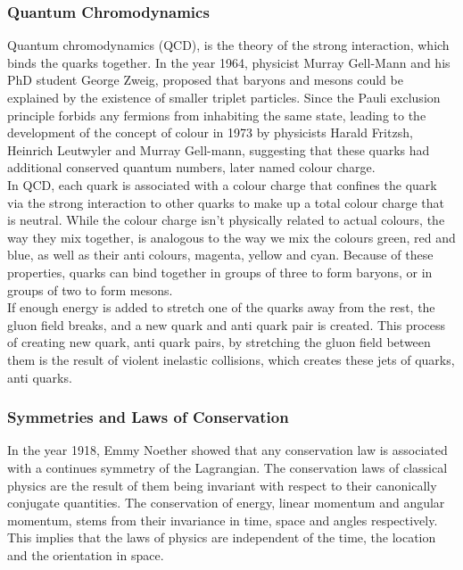 \documentclass[12pt,a4paper]{article}
\numberwithin{equation}{section}
\begin{document}
\subsubsection{Quantum Chromodynamics}
Quantum chromodynamics (QCD), is the theory of the strong interaction, which
binds the quarks together. In the year 1964, physicist Murray Gell-Mann and his
PhD student George Zweig, proposed that baryons and mesons could be explained by
the existence of smaller triplet particles\cite{GELLMANN1964214}. Since the
Pauli exclusion principle forbids any fermions from inhabiting the same state,
leading to the development of the concept of colour in 1973\cite{FRITZSCH1973365}
by physicists Harald Fritzsh, Heinrich Leutwyler and Murray Gell-mann,
suggesting that these quarks had additional conserved
quantum numbers, later named colour charge.\\

In QCD, each quark is associated with a colour charge that confines the quark via
the strong interaction to other quarks to make up a total colour charge that is
neutral. While the colour charge isn't physically related to actual colours, the
way they mix together, is analogous to the way we mix the colours green, red and
blue, as well as their anti colours, magenta, yellow and cyan. Because of these
properties, quarks can bind together in groups of three to form baryons, or in
groups of two to form mesons.\\

If enough energy is added to stretch one of the quarks away from the rest, the
gluon field breaks, and a new quark and anti quark pair is created. This process
of creating new quark, anti quark pairs, by stretching the gluon field between
them is the result of violent inelastic collisions, which creates these jets of
quarks, anti quarks.\\

\subsubsection{Symmetries and Laws of Conservation}
In the year 1918, Emmy Noether showed that any conservation law is associated
with a continues symmetry of the Lagrangian\cite{Noether_1971}. The
conservation laws of classical physics are the result of them being invariant
with respect to their canonically conjugate quantities. The conservation of
energy, linear momentum and angular momentum, stems from their invariance in
time, space and angles respectively. This implies that the laws of physics are
independent of the time, the location and the orientation in space.\\
\end{document}
